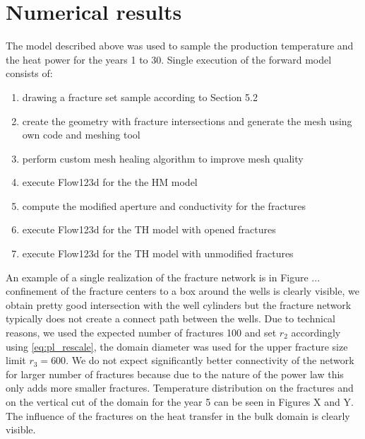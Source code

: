\documentclass{article}
\begin{document}
\section{Numerical results}
The model described above was used to sample the production temperature and the heat power for the years 1 to 30. Single execution of the forward model consists of:
\begin{enumerate}
    \item drawing a fracture set sample according to Section 5.2
    \item create the geometry with fracture intersections and generate the mesh using own code and \cite{GMSH} meshing tool
    \item perform custom mesh healing algorithm to improve mesh quality
    \item execute Flow123d for the the HM model
    \item compute the modified aperture and conductivity for the fractures
    \item execute Flow123d for the TH model with opened fractures
    \item execute Flow123d for the TH model with unmodified fractures
\end{enumerate}
An example of a single realization of the fracture network is in Figure ...
confinement of the fracture centers to a box around the wells is clearly visible, we obtain pretty good intersection with the well cylinders but the fracture network typically does not create a connect path between the wells. Due to technical reasons, we used the expected number of fractures 100 and set $r_2$ accordingly using \eqref{eq:pl_rescale}, the domain diameter was used for the upper fracture size limit $r_3=600$. We do not expect significantly better connectivity of the network for larger number of fractures because due to the nature of the power law this only adds more smaller fractures. Temperature distribution on the fractures and on the vertical cut of the domain for the year 5 can be seen in Figures X and Y.
The influence of the fractures on the heat transfer in the bulk domain is clearly visible.
\end{document}
